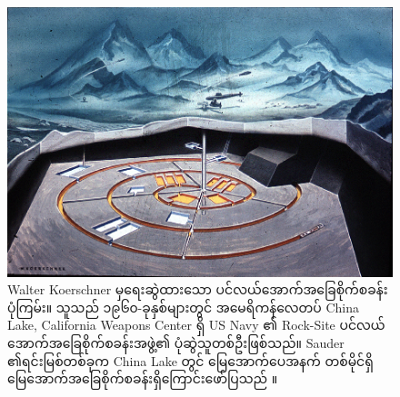 \documentclass[10pt,twocolumn,letterpaper]{article}
\begin{document}
\begin{figure}[t]
\begin{center}
   \includegraphics[width=1\linewidth]{undersea.jpg}
\end{center}
   \caption{Walter Koerschner မှရေးဆွဲထားသော ပင်လယ်အောက်အခြေစိုက်စခန်း ပုံကြမ်း။ သူသည် ၁၉၆၀-ခုနှစ်များတွင် အမေရိကန်လေတပ် China Lake, California Weapons Center ရှိ US Navy ၏ Rock-Site ပင်လယ်အောက်အခြေစိုက်စခန်းအဖွဲ့၏ ပုံဆွဲသူတစ်ဦးဖြစ်သည်။ Sauder ၏ရင်းမြစ်တစ်ခုက China Lake တွင် မြေအောက်ပေအနက် တစ်မိုင်ရှိမြေအောက်အခြေစိုက်စခန်းရှိကြောင်းဖော်ပြသည် \cite{22,23}။}
\label{fig:5}
\label{fig:onecol}
\end{figure}
\end{document}
